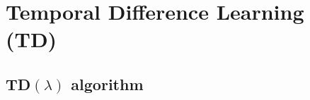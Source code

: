 \section{Temporal Difference Learning (TD)}

\subsection{TD\texorpdfstring{\( (\lambda) \)}{ (lambda) } algorithm}
